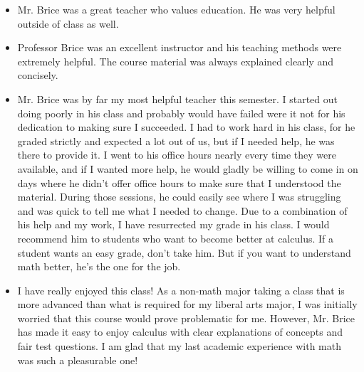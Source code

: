 \documentclass[11pt]{article}
\begin{document}
	\begin{itemize}
	
		\item{}
      Mr. Brice was a great teacher who values education.
      He was very helpful outside of class as well.
		
		\item{}
      Professor Brice was an excellent instructor and his teaching
      methods were extremely helpful.
      The course material was always explained clearly and concisely.
		
		\item{}
      Mr. Brice was by far my most helpful teacher this semester.
      I started out doing poorly in his class and probably would have
      failed were it not for his dedication to making sure I succeeded.
      I had to work hard in his class, for he graded strictly and
      expected a lot out of us, but if I needed help, he was there to
      provide it.
      I went to his office hours nearly every time they were available,
      and if I wanted more help, he would gladly be willing to come in
      on days where he didn't offer office hours to make sure that I
      understood the material.
      During those sessions, he could easily see where I was struggling
      and was quick to tell me what I needed to change.
      Due to a combination of his help and my work, I have resurrected
      my grade in his class.
      I would recommend him to students who want to become better at
      calculus.
      If a student wants an easy grade, don't take him.
      But if you want to understand math better,
      he's the one for the job.
	\end{itemize}
	


	\begin{itemize}
	
		\item{}
      I have really enjoyed this class! As a non-math major taking a
      class that is more advanced than what is required for my liberal
      arts major, I was initially worried that this course would prove
      problematic for me.
      However, Mr. Brice has made it easy to enjoy calculus with clear
      explanations of concepts and fair test questions.
      I am glad that my last academic experience with math was such a
      pleasurable one!
	\end{itemize}
	
\end{document}

